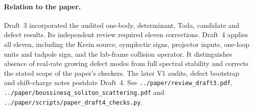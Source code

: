 \documentclass[11pt,a4paper]{article}
\newcommand{\file}[1]{\nolinkurl{#1}}
\theoremstyle{remark}\newtheorem{remark}[proposition]{Remark}
\begin{document}
\paragraph{Relation to the paper.}
Draft~3 incorporated the audited one-body, determinant, Toda, candidate
and defect results. Its independent review required eleven corrections.
Draft~4 applies all eleven, including the Krein source, symplectic signs,
projector inputs, one-loop units and tadpole sign, and the lab-frame
collision operator. It distinguishes absence of real-rate growing defect
modes from full spectral stability and corrects the stated scope of the
paper's checkers. The later V1 audits, defect bootstrap and shift-charge
notes postdate Draft~4. See \file{../paper/review_draft3.pdf},
\file{../paper/boussinesq_soliton_scattering.pdf} and
\file{../paper/scripts/paper_draft4_checks.py}.
\end{document}
